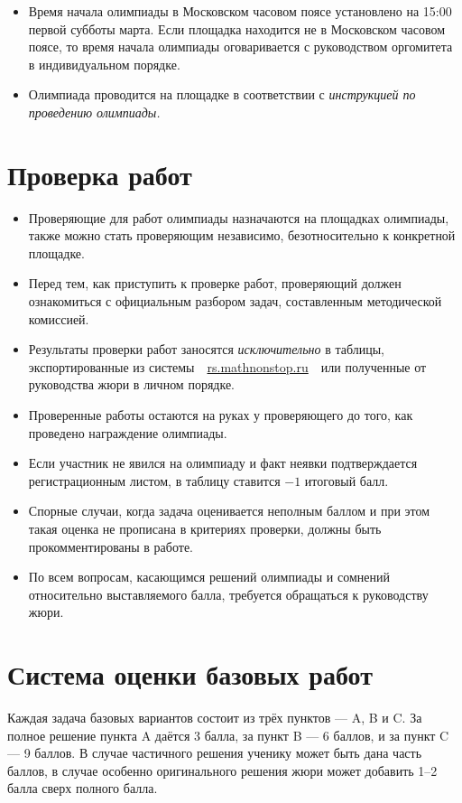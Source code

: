 \documentclass[a4paper,12pt]{article}
\begin{document}
\begin{itemize}
	\item Время начала олимпиады в Московском часовом поясе установлено на 15:00 первой субботы марта. Если площадка находится не в Московском часовом поясе, то время начала олимпиады оговаривается с руководством оргомитета в индивидуальном порядке.
	\item Олимпиада проводится на площадке в соответствии с {\it инструкцией по проведению олимпиады.}
\end{itemize}

\section{Проверка работ}

\begin{itemize}
	\item Проверяющие для работ олимпиады назначаются на площадках олимпиады, также можно стать проверяющим независимо, безотносительно к конкретной площадке.
	\item Перед тем, как приступить к проверке работ, проверяющий должен ознакомиться с официальным разбором задач, составленным методической комиссией.
	\item Результаты проверки работ заносятся {\it исключительно} в таблицы, экспортированные из системы\ \ \url{rs.mathnonstop.ru}\ \ или полученные от руководства жюри в личном порядке.
	\item Проверенные работы остаются на руках у проверяющего до того, как проведено награждение олимпиады.
	\item Если участник не явился на олимпиаду и факт неявки подтверждается регистрационным листом, в таблицу ставится $-1$ итоговый балл.
	\item Спорные случаи, когда задача оценивается неполным баллом и при этом такая оценка не прописана в критериях проверки, должны быть прокомментированы в работе.
	\item По всем вопросам, касающимся решений олимпиады и сомнений относительно выставляемого балла, требуется обращаться к руководству жюри.
\end{itemize}

\section{Система оценки базовых работ}

Каждая задача базовых вариантов состоит из трёх пунктов — A, B и C. За полное решение пункта A даётся 3 балла, за пункт B --- 6 баллов, и за пункт C --- 9 баллов. В случае частичного решения ученику может быть дана часть баллов, в случае особенно оригинального решения жюри может добавить 1–2 балла сверх полного балла.
\end{document}

